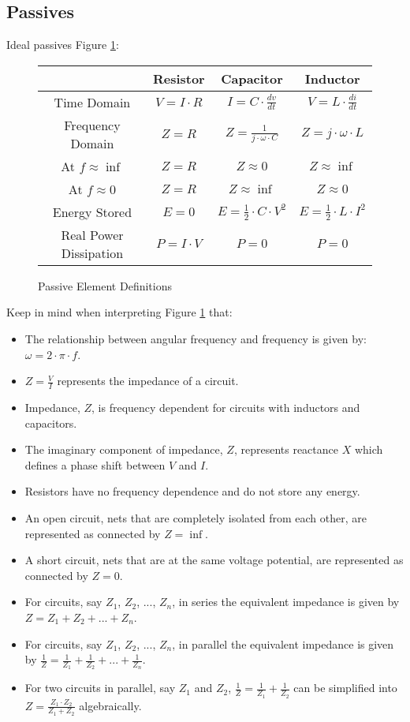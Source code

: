 \documentclass[main.tex]{subfiles}
\begin{document}
\subsection{Passives}
Ideal passives Figure \ref{fig:passive definitions}:
\begin{figure}[h!]
    \centering
    \begin{tabular}{|c|c|c|c|}
        \hline
         & Resistor & Capacitor & Inductor \\ \hline
        Time Domain & $V = I \cdot R$ & $I = C \cdot \frac{dv}{dt}$ & $V = L \cdot \frac{di}{dt}$ \\ \hline
        Frequency Domain & $Z = R$ & $Z = \frac{1}{j \cdot \omega \cdot C}$ & $Z = j \cdot \omega \cdot L$ \\ \hline
        At $f \approx \inf$ & $Z = R$ & $Z \approx 0$ & $Z \approx \inf$ \\ \hline
        At $f \approx 0$ & $Z = R$ & $Z \approx \inf$ & $Z \approx 0$ \\ \hline
        Energy Stored & $E = 0$ & $E = \frac{1}{2} \cdot C \cdot V^{2}$ & $E = \frac{1}{2} \cdot L \cdot I^{2}$ \\ \hline
        Real Power Dissipation & $P = I \cdot V$ & $P = 0$ & $P = 0$ \\ \hline
    \end{tabular}
    \caption{Passive Element Definitions}
    \label{fig:passive definitions}
\end{figure}
Keep in mind when interpreting Figure \ref{fig:passive definitions} that:
\begin{itemize}
    \item The relationship between angular frequency and frequency is given by: $\omega = 2 \cdot \pi \cdot f$.
    \item $Z = \frac{V}{I}$ represents the impedance of a circuit. 
    \item Impedance, $Z$, is frequency dependent for circuits with inductors and capacitors.
    \item The imaginary component of impedance, $Z$, represents reactance $X$ which defines a phase shift between $V$ and $I$.
    \item Resistors have no frequency dependence and do not store any energy.
    \item An open circuit, nets that are completely isolated from each other, are represented as connected by $Z = \inf$.
    \item A short circuit, nets that are at the same voltage potential, are represented as connected by $Z = 0$. 
    \item For circuits, say $Z_1$, $Z_2$, ..., $Z_n$, in series the equivalent impedance is given by $Z = Z_1 + Z_2 + ... + Z_n$.
    \item For circuits, say $Z_1$, $Z_2$, ..., $Z_n$, in parallel the equivalent impedance is given by $\frac{1}{Z} = \frac{1}{Z_1} + \frac{1}{Z_2} + ... + \frac{1}{Z_n}$.
    \item For two circuits in parallel, say $Z_1$ and $Z_2$, $\frac{1}{Z} = \frac{1}{Z_1} + \frac{1}{Z_2}$ can be simplified into $Z = \frac{Z_1 \cdot Z_2}{Z_1 + Z_2}$ algebraically.  
\end{itemize}
\end{document}
